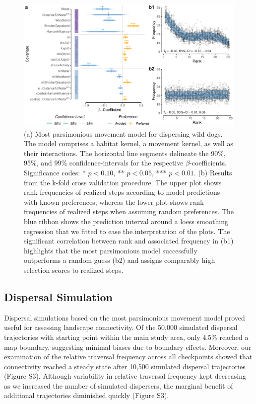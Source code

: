 \documentclass[abstract=on,10pt,a4paper,bibliography=totocnumbered]{article}
\begin{document}
\begin{figure}
  \begin{center}
    \includegraphics[width=\textwidth]{99_MovementModel}
    \caption{(a) Most parsimonious movement model for dispersing wild dogs. The
    model comprises a habitat kernel, a movement kernel, as well as their
    interactions. The horizontal line segments delineate the 90\%, 95\%, and
    99\% confidence-intervals for the respective \(\beta\)-coefficients.
    Significance codes: * \(p < 0.10\), ** \(p < 0.05\), *** \(p < 0.01\). (b)
    Results from the k-fold cross validation procedure. The upper plot shows
    rank frequencies of realized steps according to model predictions with known
    preferences, whereas the lower plot shows rank frequencies of realized steps
    when assuming random preferences. The blue ribbon shows the prediction
    interval around a loess smoothing regression that we fitted to ease the
    interpretation of the plots. The significant correlation between rank and
    associated frequency in (b1) highlights that the most parsimonious model
    successfully outperforms a random guess (b2) and assigns comparably high
    selection scores to realized steps.}
    \label{MovementModel}
  \end{center}
\end{figure}

\subsection{Dispersal Simulation}
Dispersal simulations based on the most parsimonious movement model proved
useful for assessing landscape connectivity. Of the 50,000 simulated dispersal
trajectories with starting point within the main study area, only 4.5\% reached
a map boundary, suggesting minimal biases due to boundary effects. Moreover, our
examination of the relative traversal frequency across all checkpoints showed
that connectivity reached a steady state after 10,500 simulated dispersal
trajectories (Figure S3). Although variability in relative traversal frequency
kept decreasing as we increased the number of simulated dispersers, the marginal
benefit of additional trajectories diminished quickly (Figure S3).
\end{document}
